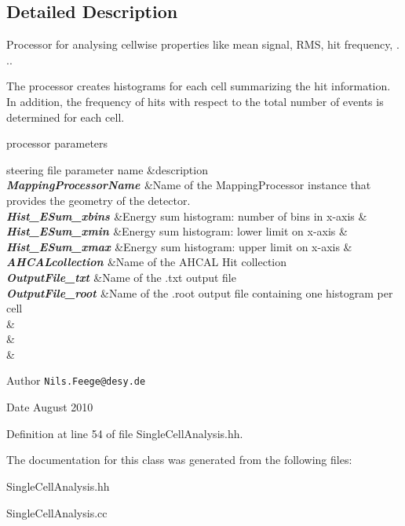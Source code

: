 \subsection{Detailed Description}
Processor for analysing cellwise properties like mean signal, RMS, hit frequency, . ..

The processor creates histograms for each cell summarizing the hit information. In addition, the frequency of hits with respect to the total number of events is determined for each cell.

\begin{DoxyParagraph}{processor parameters}
\begin{TabularC}{3}
\hline
steering file parameter name &description  \\
{\bfseries {\itshape  MappingProcessorName \/}}&Name of the MappingProcessor instance that provides the geometry of the detector.  \\
{\bfseries {\itshape  Hist\_\-ESum\_\-xbins \/}}&Energy sum histogram: number of bins in x-\/axis &\\
{\bfseries {\itshape  Hist\_\-ESum\_\-xmin \/}}&Energy sum histogram: lower limit on x-\/axis &\\
{\bfseries {\itshape  Hist\_\-ESum\_\-xmax \/}}&Energy sum histogram: upper limit on x-\/axis &\\
{\bfseries {\itshape  AHCALcollection \/}}&Name of the AHCAL Hit collection  \\
{\bfseries {\itshape  OutputFile\_\-txt \/}}&Name of the .txt output file  \\
{\bfseries {\itshape  OutputFile\_\-root \/}}&Name of the .root output file containing one histogram per cell  \\
{\bfseries {\itshape  \/}}&\\
{\bfseries {\itshape  \/}}&\\
{\bfseries {\itshape  \/}}&\\
\end{TabularC}

\end{DoxyParagraph}
\begin{DoxyAuthor}{Author}
{\tt Nils.Feege@desy.de} 
\end{DoxyAuthor}
\begin{DoxyDate}{Date}
August 2010 
\end{DoxyDate}


Definition at line 54 of file SingleCellAnalysis.hh.

The documentation for this class was generated from the following files:\begin{DoxyCompactItemize}
\item 
SingleCellAnalysis.hh\item 
SingleCellAnalysis.cc\end{DoxyCompactItemize}
